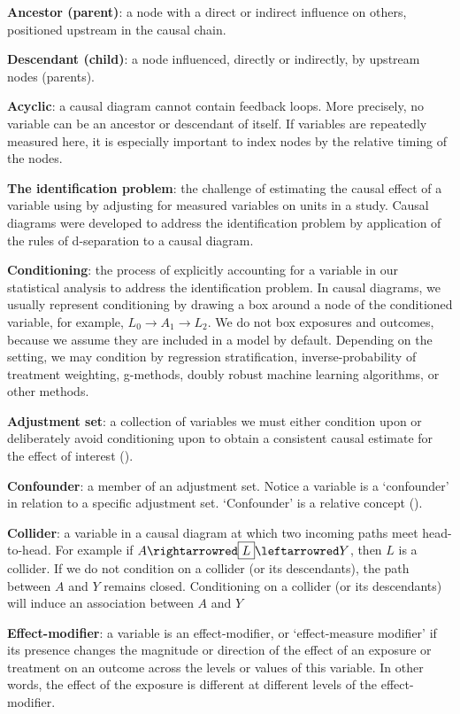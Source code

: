 \documentclass[
  singlecolumn]{article}
\begin{document}
\textbf{Ancestor (parent)}: a node with a direct or indirect influence
on others, positioned upstream in the causal chain.

\textbf{Descendant (child)}: a node influenced, directly or indirectly,
by upstream nodes (parents).

\textbf{Acyclic}: a causal diagram cannot contain feedback loops. More
precisely, no variable can be an ancestor or descendant of itself. If
variables are repeatedly measured here, it is especially important to
index nodes by the relative timing of the nodes.

\textbf{The identification problem}: the challenge of estimating the
causal effect of a variable using by adjusting for measured variables on
units in a study. Causal diagrams were developed to address the
identification problem by application of the rules of d-separation to a
causal diagram.

\textbf{Conditioning}: the process of explicitly accounting for a
variable in our statistical analysis to address the identification
problem. In causal diagrams, we usually represent conditioning by
drawing a box around a node of the conditioned variable, for example,
\(\boxed{L_{0}}\to A_{1} \to L_{2}\). We do not box exposures and
outcomes, because we assume they are included in a model by default.
Depending on the setting, we may condition by regression stratification,
inverse-probability of treatment weighting, g-methods, doubly robust
machine learning algorithms, or other methods.

\textbf{Adjustment set}: a collection of variables we must either
condition upon or deliberately avoid conditioning upon to obtain a
consistent causal estimate for the effect of interest
().

\textbf{Confounder}: a member of an adjustment set. Notice a variable is
a `confounder' in relation to a specific adjustment set. `Confounder' is
a relative concept ().

\textbf{Collider}: a variable in a causal diagram at which two incoming
paths meet head-to-head. For example if
\(A \rightarrowred \boxed{L} \leftarrowred Y\), then \(L\) is a
collider. If we do not condition on a collider (or its descendants), the
path between \(A\) and \(Y\) remains closed. Conditioning on a collider
(or its descendants) will induce an association between \(A\) and \(Y\)

\textbf{Effect-modifier}: a variable is an effect-modifier, or
`effect-measure modifier' if its presence changes the magnitude or
direction of the effect of an exposure or treatment on an outcome across
the levels or values of this variable. In other words, the effect of the
exposure is different at different levels of the effect-modifier.
\end{document}
